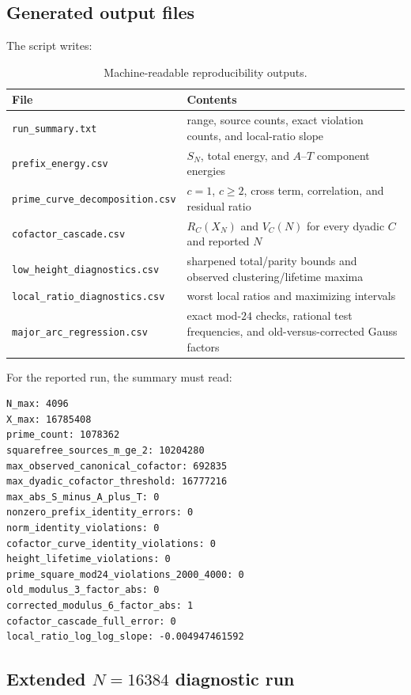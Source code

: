 \documentclass[11pt]{article}
\theoremstyle{definition}
\theoremstyle{remark}
\newcommand{\1}{\mathbf{1}}
\begin{document}
\subsection{Generated output files}

The script writes:

\begin{table}[htbp]
\centering
\caption{Machine-readable reproducibility outputs.}
\label{tab:repro-files}
\small
\begin{tabular}{lp{}}
\toprule
File & Contents\\
\midrule
\texttt{run\_summary.txt}
& range, source counts, exact violation counts, and local-ratio slope\\
\texttt{prefix\_energy.csv}
& $S_N$, total energy, and $A$--$T$ component energies\\
\texttt{prime\_curve\_decomposition.csv}
& $c=1$, $c\ge2$, cross term, correlation, and residual ratio\\
\texttt{cofactor\_cascade.csv}
& $R_C(X_N)$ and $V_C(N)$ for every dyadic $C$ and reported $N$\\
\texttt{low\_height\_diagnostics.csv}
& sharpened total/parity bounds and observed clustering/lifetime maxima\\
\texttt{local\_ratio\_diagnostics.csv}
& worst local ratios and maximizing intervals\\
\texttt{major\_arc\_regression.csv}
& exact mod-$24$ checks, rational test frequencies, and old-versus-corrected Gauss factors\\
\bottomrule
\end{tabular}
\end{table}

For the reported run, the summary must read:
\begin{verbatim}
N_max: 4096
X_max: 16785408
prime_count: 1078362
squarefree_sources_m_ge_2: 10204280
max_observed_canonical_cofactor: 692835
max_dyadic_cofactor_threshold: 16777216
max_abs_S_minus_A_plus_T: 0
nonzero_prefix_identity_errors: 0
norm_identity_violations: 0
cofactor_curve_identity_violations: 0
height_lifetime_violations: 0
prime_square_mod24_violations_2000_4000: 0
old_modulus_3_factor_abs: 0
corrected_modulus_6_factor_abs: 1
cofactor_cascade_full_error: 0
local_ratio_log_log_slope: -0.004947461592
\end{verbatim}

\subsection{\texorpdfstring{Extended $N=16384$ diagnostic run}{Extended N=16384 diagnostic run}}
\end{document}

